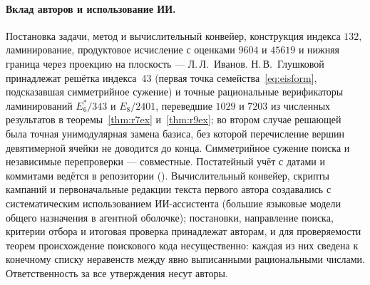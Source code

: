 \paragraph{Вклад авторов и использование ИИ.}
Постановка задачи, метод и вычислительный конвейер, конструкция индекса
$132$, ламинирование, продуктовое исчисление с оценками $9604$ и $45619$ и
нижняя граница через проекцию на плоскость --- Л.\,Л.~Иванов. Н.\,В.~Глушковой принадлежат решётка
индекса~$43$ (первая точка семейства~\eqref{eq:eisform}, подсказавшая
симметрийное сужение) и точные рациональные верификаторы ламинирований
$E_6^*/343$ и $E_8/2401$, переведшие $1029$ и $7203$ из численных результатов
в теоремы~\ref{thm:r7ex} и~\ref{thm:r9ex}; во втором случае решающей была
точная унимодулярная замена базиса, без которой перечисление вершин
девятимерной ячейки не доводится до конца. Симметрийное сужение поиска и
независимые перепроверки --- совместные. Постатейный учёт с датами и коммитами ведётся
в репозитории (). Вычислительный конвейер, скрипты
кампаний и первоначальные редакции текста первого автора создавались с
систематическим использованием ИИ-ассистента (большие языковые модели
общего назначения в агентной оболочке); постановки, направление поиска, критерии отбора и
итоговая проверка принадлежат авторам, и для проверяемости теорем
происхождение поискового кода несущественно: каждая из них сведена к
конечному списку неравенств между явно выписанными рациональными числами.
Ответственность за все утверждения несут авторы.
